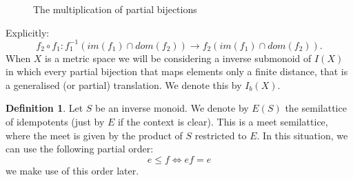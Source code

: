 \documentclass[11pt]{amsart}
\theoremstyle{plain}
\theoremstyle{definition}%
\newtheorem{definition}[theorem]{Definition}%
\theoremstyle{remark}%
\begin{document}
\begin{figure}[h]
\begin{center}

\def\firstcircle{(-0.25,-1.25) circle (1.0cm)}
\def\secondcircle{(-0.25,0) circle (1.0cm)}
\def\thirdcircle{(-4.75,0) circle (1.0cm)}
\def\forthcircle{(-4.75,-2.5) circle (1.0cm)}
\def\fifthcircle{(-4.75,-1.25) circle (1.0cm)}

    
\setlength{\parskip}{5mm}

\caption{The multiplication of partial bijections}
\label{Fig:Comp}
\end{center}
\end{figure}
Explicitly:
\begin{equation*}
f_{2}\circ f_{1}: f_{1}^{-1}(im(f_{1})\cap dom(f_{2})) \rightarrow f_{2}(im(f_{1})\cap dom(f_{2})).
\end{equation*}
When $X$ is a metric space we will be considering a inverse submonoid of $I(X)$ in which every partial bijection that maps elements only a finite distance, that is a generalised (or partial) translation. We denote this by $I_{b}(X)$.

\begin{definition}
Let $S$ be an inverse monoid. We denote by $E(S)$ the semilattice of idempotents (just by $E$ if the context is clear). This is a meet semilattice, where the meet is given by the product of $S$ restricted to $E$. In this situation, we can use the following partial order:
\begin{equation*}
e \leq f \Leftrightarrow ef=e
\end{equation*}
we make use of this order later.
\end{definition}
\end{document}
